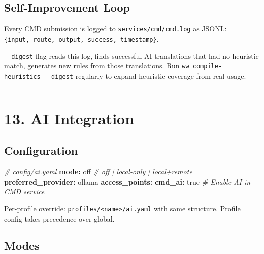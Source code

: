 \documentclass[
]{article}
\newenvironment{Shaded}{\begin{snugshade}}{\end{snugshade}}
\newcommand{\AttributeTok}[1]{\textcolor[rgb]{0.13,0.29,0.53}{#1}}
\newcommand{\CharTok}[1]{\textcolor[rgb]{0.31,0.60,0.02}{#1}}
\newcommand{\CommentTok}[1]{\textcolor[rgb]{0.56,0.35,0.01}{\textit{#1}}}
\newcommand{\FunctionTok}[1]{\textcolor[rgb]{0.13,0.29,0.53}{\textbf{#1}}}
\newcommand{\KeywordTok}[1]{\textcolor[rgb]{0.13,0.29,0.53}{\textbf{#1}}}
\begin{document}
\subsection{Self-Improvement Loop}\label{self-improvement-loop}

Every CMD submission is logged to \texttt{services/cmd/cmd.log} as
JSONL: \texttt{\{input,\ route,\ output,\ success,\ timestamp\}}.

\texttt{-\/-digest} flag reads this log, finds successful AI
translations that had no heuristic match, generates new rules from those
translations. Run \texttt{ww\ compile-heuristics\ -\/-digest} regularly
to expand heuristic coverage from real usage.

\begin{center}\rule{0.5\linewidth}{0.5pt}\end{center}

\section{13. AI Integration}\label{ai-integration}

\subsection{Configuration}\label{configuration}

\begin{Shaded}
\begin{Highlighting}[]
\CommentTok{\# config/ai.yaml}
\FunctionTok{mode}\KeywordTok{:}\AttributeTok{ }\CharTok{off}\CommentTok{                    \# off | local{-}only | local+remote}
\FunctionTok{preferred\_provider}\KeywordTok{:}\AttributeTok{ ollama}
\FunctionTok{access\_points}\KeywordTok{:}
\AttributeTok{  }\FunctionTok{cmd\_ai}\KeywordTok{:}\AttributeTok{ }\CharTok{true}\CommentTok{               \# Enable AI in CMD service}
\end{Highlighting}
\end{Shaded}

Per-profile override:
\texttt{profiles/\textless{}name\textgreater{}/ai.yaml} with same
structure. Profile config takes precedence over global.

\subsection{Modes}\label{modes}
\end{document}
